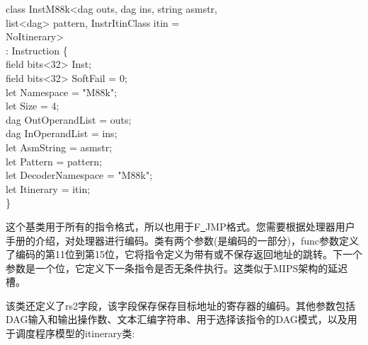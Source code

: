 \begin{tcolorbox}[colback=white,colframe=black]
class InstM88k<dag outs, dag ins, string asmstr, \\
\hspace*{2cm}list<dag> pattern, InstrItinClass itin = \\
\hspace*{2.5cm}NoItinerary> \\
\hspace*{1.3cm}: Instruction \{ \\
\hspace*{1cm}field bits<32> Inst; \\
\hspace*{1cm}field bits<32> SoftFail = 0; \\
\hspace*{1cm}let Namespace = "M88k"; \\
\hspace*{1cm}let Size = 4; \\
\hspace*{1cm}dag OutOperandList = outs; \\
\hspace*{1cm}dag InOperandList = ins; \\ 
\hspace*{1cm}let AsmString = asmstr; \\
\hspace*{1cm}let Pattern = pattern; \\
\hspace*{1cm}let DecoderNamespace = "M88k"; \\
\hspace*{1cm}let Itinerary = itin; \\
\}
\end{tcolorbox}

这个基类用于所有的指令格式，所以也用于F\underline{~}JMP格式。您需要根据处理器用户手册的介绍，对处理器进行编码。类有两个参数(是编码的一部分)，func参数定义了编码的第11位到第15位，它将指令定义为带有或不保存返回地址的跳转。下一个参数是一个位，它定义下一条指令是否无条件执行。这类似于MIPS架构的延迟槽。\par

该类还定义了rs2字段，该字段保存保存目标地址的寄存器的编码。其他参数包括DAG输入和输出操作数、文本汇编字符串、用于选择该指令的DAG模式，以及用于调度程序模型的itinerary类:\par

